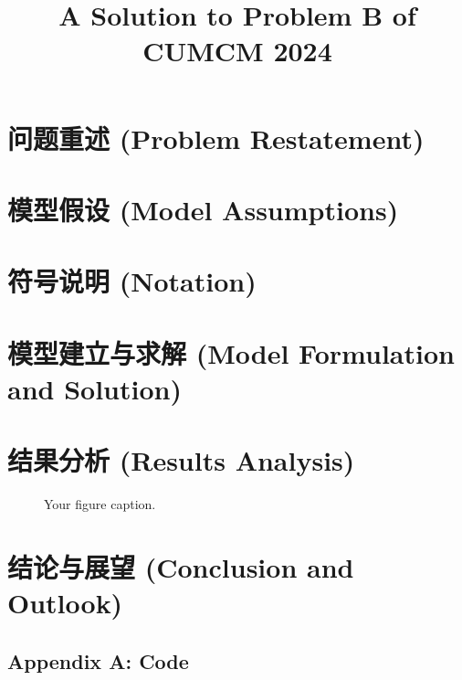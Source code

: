 \documentclass[withoutpreface,bwprint]{../template/cumcm}
\title{A Solution to Problem B of CUMCM 2024} %
\begin{document}
\maketitle

\begin{abstract}

\end{abstract}

\section{问题重述 (Problem Restatement)}

\section{模型假设 (Model Assumptions)}

\section{符号说明 (Notation)}

\section{模型建立与求解 (Model Formulation and Solution)}

\section{结果分析 (Results Analysis)}
\begin{figure}[htbp]
    \centering
    \caption{Your figure caption.}
    \label{fig:your_figure}
\end{figure}

\section{结论与展望 (Conclusion and Outlook)}



\begin{appendices}
\section{Appendix A: Code}
\end{appendices}
\end{document}
